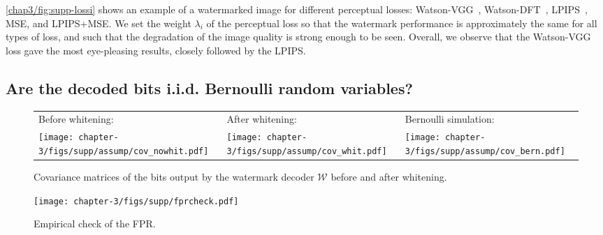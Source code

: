 \autoref{chap3/fig:supp-lossi} shows an example of a watermarked image for different perceptual losses: Watson-VGG~\citep{czolbe2020loss}, Watson-DFT~\citep{czolbe2020loss}, LPIPS~\citep{zhang2018unreasonable}, MSE, and LPIPS+MSE.
We set the weight $\lambda_i$ of the perceptual loss so that the watermark performance is approximately the same for all types of loss, and such that the degradation of the image quality is strong enough to be seen.
Overall, we observe that the Watson-VGG loss gave the most eye-pleasing results, closely followed by the LPIPS.









\subsection{Are the decoded bits i.i.d. Bernoulli random variables?}\label{chap3/app:assumption}

\begin{figure}[b]
    \begin{minipage}{0.67\textwidth}
        \centering
        \scriptsize
        \newcommand{\imheight}{0.33\textwidth}
        \setlength{\tabcolsep}{0pt}
        \begin{tabular}{lll}
            Before whitening: & After whitening: & Bernoulli simulation: \\
            \texttt{[image: chapter-3/figs/supp/assump/cov\_nowhit.pdf]} &
            \texttt{[image: chapter-3/figs/supp/assump/cov\_whit.pdf]} &
            \texttt{[image: chapter-3/figs/supp/assump/cov\_bern.pdf]} \\
        \end{tabular}
        \caption{Covariance matrices of the bits output by the watermark decoder $\mathcal{W}$ before and after whitening.}
        \label{chap3/fig:supp-assumption}
    \end{minipage}\hfill
    \begin{minipage}{0.27\textwidth}
        \centering
        \texttt{[image: chapter-3/figs/supp/fprcheck.pdf]}
        \caption{Empirical check of the FPR.}
        \label{chap3/fig:supp-fpr-check}
    \end{minipage}
\end{figure}



